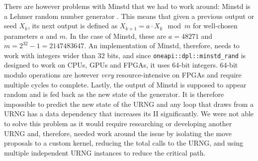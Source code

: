 
There are however problems with Minstd that we had to work around: Minstd is a Lehmer random number generator \cite{lehmer1951mathematical}. This means that given a previous output or seed $X_{k}$, its next output is defined as $X_{k+1} = a \cdot X_k \mod m$ for well-chosen parameters $a$ and $m$. In the case of Minstd, these are $a = 48271$ and $m = 2^{32} - 1 = 2147483647$. An implementation of Minstd, therefore, needs to work with integers wider than 32 bits, and since \texttt{oneapi::dpl::minstd\_rand} is designed to work on \acsp{CPU}, \acsp{GPU} and \acsp{FPGA}, it uses 64-bit integers. 64-bit modulo operations are however \emph{very} resource-intensive on \acp{FPGA} and require multiple cycles to complete. Lastly, the output of Minstd is supposed to appear random and is fed back as the new state of the generator. It is therefore impossible to predict the new state of the \ac{URNG} and any loop that draws from a \ac{URNG} has a data dependency that increases its \ac{II} significantly. We were not able to solve this problem as it would require researching or developing another \ac{URNG} and, therefore, needed work around the issue by isolating the move proposals to a custom kernel, reducing the total calls to the \ac{URNG}, and using multiple independent \ac{URNG} instances to reduce the critical path.